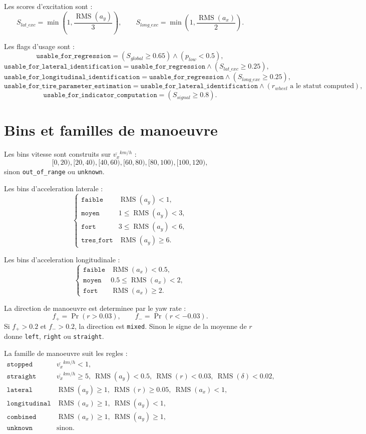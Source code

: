 \documentclass[11pt,a4paper]{article}
\newcommand{\RMS}{\operatorname{RMS}}
\begin{document}
Les scores d'excitation sont :
\[
  S_{lat\_exc}=\min\left(1,\frac{\RMS(a_y)}{3}\right),
  \qquad
  S_{long\_exc}=\min\left(1,\frac{\RMS(a_x)}{2}\right).
\]

Les flags d'usage sont :
\[
  \texttt{usable\_for\_regression}
  =
  (S_{global}\ge 0.65)\land(p_{low}<0.5),
\]
\[
  \texttt{usable\_for\_lateral\_identification}
  =
  \texttt{usable\_for\_regression}\land(S_{lat\_exc}\ge 0.25),
\]
\[
  \texttt{usable\_for\_longitudinal\_identification}
  =
  \texttt{usable\_for\_regression}\land(S_{long\_exc}\ge 0.25),
\]
\[
  \texttt{usable\_for\_tire\_parameter\_estimation}
  =
  \texttt{usable\_for\_lateral\_identification}
  \land
  (r_{wheel}\text{ a le statut computed}),
\]
\[
  \texttt{usable\_for\_indicator\_computation}
  =
  (S_{signal}\ge 0.8).
\]

\section{Bins et familles de manoeuvre}

Les bins vitesse sont construits sur $\overline{v_x}^{km/h}$ :
\[
  [0,20),[20,40),[40,60),[60,80),[80,100),[100,120),
\]
sinon \texttt{out\_of\_range} ou \texttt{unknown}.

Les bins d'acceleration laterale :
\[
\begin{cases}
\texttt{faible} & \RMS(a_y)<1,\\
\texttt{moyen} & 1\le \RMS(a_y)<3,\\
\texttt{fort} & 3\le \RMS(a_y)<6,\\
\texttt{tres\_fort} & \RMS(a_y)\ge 6.
\end{cases}
\]

Les bins d'acceleration longitudinale :
\[
\begin{cases}
\texttt{faible} & \RMS(a_x)<0.5,\\
\texttt{moyen} & 0.5\le \RMS(a_x)<2,\\
\texttt{fort} & \RMS(a_x)\ge 2.
\end{cases}
\]

La direction de manoeuvre est determinee par le yaw rate :
\[
  f_+=\Pr(r>0.03),\qquad f_-=\Pr(r<-0.03).
\]
Si $f_+>0.2$ et $f_->0.2$, la direction est \texttt{mixed}. Sinon le signe de la moyenne de $r$ donne \texttt{left}, \texttt{right} ou \texttt{straight}.

La famille de manoeuvre suit les regles :
\[
\begin{array}{ll}
\texttt{stopped} & \overline{v_x}^{km/h}<1,\\
\texttt{straight} & \overline{v_x}^{km/h}\ge 5,\ \RMS(a_y)<0.5,\ \RMS(r)<0.03,\ \RMS(\delta)<0.02,\\
\texttt{lateral} & \RMS(a_y)\ge 1,\ \RMS(r)\ge 0.05,\ \RMS(a_x)<1,\\
\texttt{longitudinal} & \RMS(a_x)\ge 1,\ \RMS(a_y)<1,\\
\texttt{combined} & \RMS(a_x)\ge 1,\ \RMS(a_y)\ge 1,\\
\texttt{unknown} & \text{sinon.}
\end{array}
\]
\end{document}
